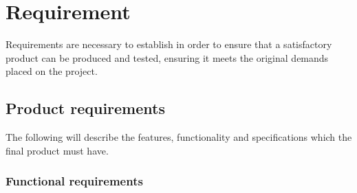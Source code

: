 \section{Requirement}
\label{section:requirement}

Requirements are necessary to establish in order to ensure that a satisfactory product can be produced and tested, ensuring it meets the original demands placed on the project.

\subsection{Product requirements}
\label{subsection:product_requirements}

The following will describe the features, functionality and specifications which the final product must have.



\subsubsection{Functional requirements}

